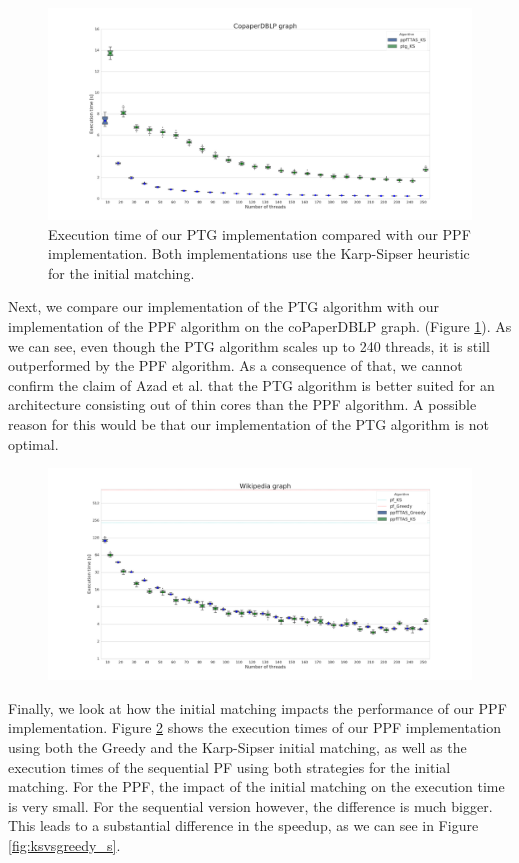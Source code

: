 \documentclass[letterpaper]{article}
\begin{document}
\begin{figure}
	\caption{Execution time of our PTG implementation compared with our PPF implementation. Both implementations use the Karp-Sipser heuristic for the initial matching.}
	\label{fig:tgvsppf}
	\includegraphics[width=\textwidth]{../../plot/output/report/coPaperDBLP_TGvsPPFTTAS.png}
\end{figure}

Next, we compare our implementation of the PTG algorithm with our implementation of the PPF algorithm on the coPaperDBLP graph. (Figure \ref{fig:tgvsppf}). As we can see, even though the PTG algorithm scales up to 240 threads, it is still outperformed by the PPF algorithm. As a consequence of that, we cannot confirm the claim of Azad et al. that the PTG algorithm is better suited for an architecture consisting out of thin cores than the PPF algorithm. A possible reason for this would be that our implementation of the PTG algorithm is not optimal.\\

\begin{figure}
	\caption{}
	\label{fig:ksvsgreedy}
	\includegraphics[width=\textwidth]{../../plot/output/report/wikipedia_PFvsPPFTTAS.png}
\end{figure}
Finally, we look at how the initial matching impacts the performance of our PPF implementation. Figure \ref{fig:ksvsgreedy} shows the execution times of our PPF implementation using both the Greedy and the Karp-Sipser initial matching, as well as the execution times of the sequential PF using both strategies for the initial matching. For the PPF, the impact of the initial matching on the execution time is very small. For the sequential version however, the difference is much bigger. This leads to a substantial difference in the speedup, as we can see in Figure \ref{fig:ksvsgreedy_s}. 
\end{document}
